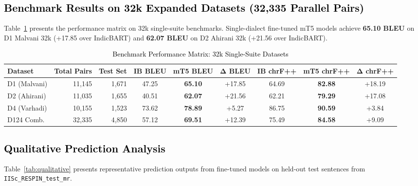 \subsection{\textcolor{black}{Benchmark Results on 32k Expanded Datasets (32,335 Parallel Pairs)}}

Table~\ref{tab:results_32k} presents the performance matrix on 32k single-suite benchmarks. Single-dialect fine-tuned mT5 models achieve \textbf{65.10 BLEU} on D1 Malvani 32k (+17.85 over IndicBART) and \textbf{62.07 BLEU} on D2 Ahirani 32k (+21.56 over IndicBART).

\begin{table}[t]
\color{black}
\centering
\caption{\textcolor{black}{Benchmark Performance Matrix: 32k Single-Suite Datasets}}
\label{tab:results_32k}
\begin{tabular}{lrrcccccc}
\hline
\textbf{Dataset} & \textbf{Total Pairs} & \textbf{Test Set} & \textbf{IB BLEU} & \textbf{mT5 BLEU} & $\boldsymbol{\Delta}$\textbf{ BLEU} & \textbf{IB chrF++} & \textbf{mT5 chrF++} & $\boldsymbol{\Delta}$\textbf{ chrF++} \\
\hline
D1 (Malvani) & 11,145 & 1,671 & 47.25 & \textbf{65.10} & +17.85 & 64.69 & \textbf{82.88} & +18.19 \\
D2 (Ahirani) & 11,035 & 1,655 & 40.51 & \textbf{62.07} & +21.56 & 62.21 & \textbf{79.29} & +17.08 \\
D4 (Varhadi) & 10,155 & 1,523 & 73.62 & \textbf{78.89} & +5.27 & 86.75 & \textbf{90.59} & +3.84 \\
\hline
D124 Comb. & 32,335 & 4,850 & 57.12 & \textbf{69.51} & +12.39 & 75.49 & \textbf{84.58} & +9.09 \\
\hline
\end{tabular}
\end{table}

\subsection{\textcolor{black}{Qualitative Prediction Analysis}}

Table~\ref{tab:qualitative} presents representative prediction outputs from fine-tuned models on held-out test sentences from \texttt{IISc\_RESPIN\_test\_mr}.

